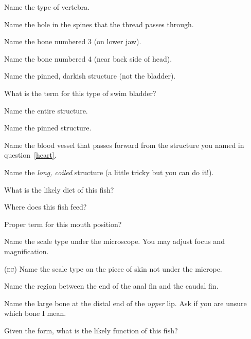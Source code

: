 \documentclass{exam}
\begin{document}
\begin{questions}

{\Large 
\question Name the type of vertebra.

\question Name the hole in the spines that the thread passes through.
\vspace{2\baselineskip}


\question Name the bone numbered 3 (on lower jaw).

\question Name the bone numbered 4 (near back side of head).
\vspace{2\baselineskip}


\question Name the pinned, darkish structure (not the bladder).

\question What is the term for this type of swim bladder?
\vspace{2\baselineskip}


\question \label{heart}Name the entire structure.

\question Name the pinned structure.

\question Name the blood vessel that passes forward from the structure you named in question~\ref{heart}.
\vspace{2\baselineskip}


\question Name the \emph{long, coiled} structure (a little tricky but you can do it!).

\question What is the likely diet of this fish?

\question Where does this fish feed?

\question Proper term for this mouth position?
\vspace{2\baselineskip}


\question Name the scale type under the microscope. You may adjust focus and magnification.

\bonusquestion \textsc{(ec)} Name the scale type on the piece of skin not under the micrope.

\vspace{2\baselineskip}


\question Name the region between the end of the anal fin and the caudal fin.

\question Name the large bone at the distal end of the \textit{upper} lip. Ask if you are unsure which bone I mean.

\question Given the form, what is the likely function of this fish?

\vspace{2\baselineskip}


}
\end{questions}
\end{document}
